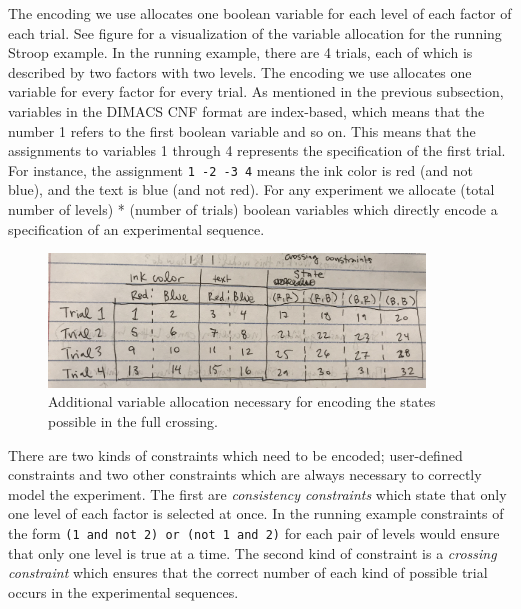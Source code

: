 The encoding we use allocates one boolean variable for each level of each factor of each trial. See figure  for a visualization of the variable allocation for the running Stroop example. In the running example, there are 4 trials, each of which is described by two factors with two levels. The encoding we use allocates one variable for every factor for every trial. As mentioned in the previous subsection, variables in the DIMACS CNF format are index-based, which means that the number 1 refers to the first boolean variable and so on. This means that the assignments to variables 1 through 4 represents the specification of the first trial. For instance, the assignment \texttt{1 -2 -3 4} means the ink color is red (and not blue), and the text is blue (and not red). For any experiment we allocate (total number of levels) * (number of trials) boolean variables which directly encode a specification of an experimental sequence.

\begin{figure}[t]
    \centerline{\includegraphics[origin=c,width=10cm]{stroop_crossing_vars}}
    \caption{Additional variable allocation necessary for encoding the states possible in the full crossing.}%
    \label{fig:stroop_crossing_vars}%
\end{figure}

There are two kinds of constraints which need to be encoded; user-defined constraints and two other constraints which are always necessary to correctly model the experiment. The first are \emph{consistency constraints} which state that only one level of each factor is selected at once. In the running example constraints of the form \texttt{(1 and not 2) or (not 1 and 2)} for each pair of levels would ensure that only one level is true at a time. The second kind of constraint is a \emph{crossing constraint} which ensures that the correct number of each kind of possible trial occurs in the experimental sequences.

